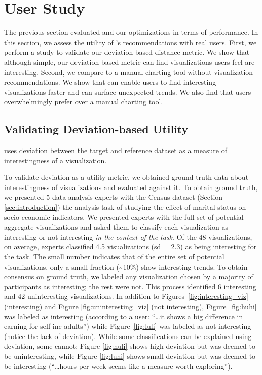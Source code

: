 
\section{User Study}
\label{sec:user_study}

The previous section evaluated \SeeDB 
and our optimizations in terms of performance.
In this section, we assess the utility of \SeeDB's recommendations 
with real users.
First, we perform a study to validate our deviation-based distance metric.
We show that although simple, our deviation-based
metric can find visualizations users feel are interesting.
Second, we compare \SeeDB
to a manual charting tool without visualization recommendations.
We show that \SeeDB can enable users to find interesting visualizations
faster and can surface unexpected trends.
We also find that users overwhelmingly prefer \SeeDB over a manual charting 
tool.

\subsection{Validating Deviation-based Utility}
\label{sec:validating_metric}

\SeeDB uses deviation between the target and reference dataset as a measure
of interestingness of a visualization.

To validate deviation as a utility metric, we obtained ground truth data about
interestingness of visualizations and evaluated \SeeDB against it.
To obtain ground truth, we presented 5 data analysis experts with the Census 
dataset (Section \ref{sec:introduction}) the analysis task of
studying the effect of marital status on socio-economic indicators.
We presented experts with the full set of potential aggregate visualizations 
and asked them to classify each visualization as interesting or
not interesting {\em in the context of the task}.
Of the 48 visualizations, on average, experts classified 4.5 visualizations
(sd = 2.3) as being interesting for the task.
The small number indicates that of the entire set of potential visualizations, 
only a small fraction (\textasciitilde10\%) show interesting trends.
To obtain consensus on ground truth, we labeled
any visualization chosen by a majority of participants as 
interesting; the rest were not. 
This process identified 6 interesting and 42 uninteresting visualizations.
In addition to Figures~\ref{fig:interesting_viz} (interesting) and Figure 
\ref{fig:uninteresting_viz} (not interesting), Figure~\ref{fig:huhi} 
was labeled as interesting (according to a user: ``\ldots it
shows a big difference in earning for self-inc adults'') while 
Figure~\ref{fig:luli} was labeled as not interesting (notice the lack of deviation).
While some classifications can be explained using deviation, some cannot: 
Figure \ref{fig:huli} shows high deviation but was deemed to be uninteresting, 
while Figure \ref{fig:luhi} shows small 
deviation but was deemed to be interesting (``\ldots hours-per-week seems like a 
measure worth exploring''). 

